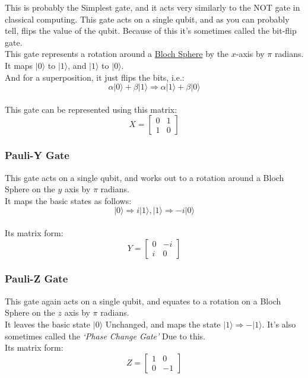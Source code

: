 \documentclass[../main.tex]{subfiles}
\begin{document}
This is probably the Simplest gate, and it acts very similarly to the NOT gate in classical computing.
This gate acts on a single qubit, and as you can probably tell, flips the value of the qubit.
Because of this it's sometimes called the bit-flip gate.\\
This gate represents a rotation around a
\href{https://en.wikipedia.org/wiki/Bloch_sphere}{Bloch Sphere} by the
\(x\)-axis by \(\pi\) radians.\\
It maps \(\lvert0\rangle\) to \(\lvert1\rangle\), and \(\lvert1\rangle\) to
\(\lvert0\rangle\).\\
And for a superposition, it just flips the bits, i.e.:\\
\[
\alpha\lvert0\rangle + \beta\lvert1\rangle \Rightarrow \alpha\lvert1\rangle + \beta\lvert0\rangle\]\\
This gate can be represented using this matrix:\\
\begin{equation}
	X = \left[ \begin{matrix} 0 & 1\\1 & 0\end{matrix} \right]
\end{equation}

\subsubsection{Pauli-Y Gate}

This gate acts on a single qubit, and works out to a rotation around a
Bloch Sphere on the \(y\) axis by \(\pi\) radians.\\
It maps the basic states as follows:\\
\[
\lvert0\rangle \Rightarrow i\lvert1\rangle, \lvert1\rangle \Rightarrow -i\lvert0\rangle\]\\
Its matrix form:\\
\begin{equation}
	Y = \left[ \begin{matrix} 0 & -i\\i & 0\end{matrix} \right]
\end{equation}

\subsubsection{Pauli-Z Gate}

This gate again acts on a single qubit, and equates to a rotation on a
Bloch Sphere on the \(z\) axis by \(\pi\) radians.\\
It leaves the basic state \(\lvert0\rangle\) Unchanged, and maps the state
\(\lvert1\rangle \Rightarrow -\lvert1\rangle\). It's also sometimes called the
\emph{`Phase Change Gate'} Due to this.\\
Its matrix form:\\
\begin{equation}
	Z = \left[ \begin{matrix} 1 & 0\\0 & -1\end{matrix} \right]
\end{equation}
\end{document}
